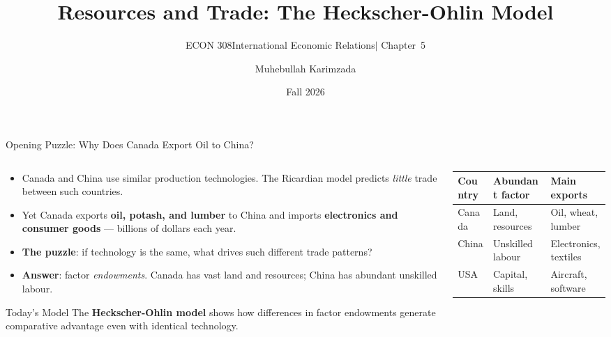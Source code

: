 \documentclass[aspectratio=169]{beamer}
\title{\textbf{Resources and Trade: The Heckscher-Ohlin Model}}
\subtitle{{\large ECON 308\enspace International Economic
  Relations\enspace\textcolor{UNBCGold}{$|$}\enspace
  Chapter~5}}
\author{Muhebullah Karimzada}
\institute{School of Economics\\
           University of Northern British Columbia}
\date{Fall 2026}
\begin{document}

\begin{frame}[plain]
\titlepage
\end{frame}

\begin{frame}[shrink=10]{Opening Puzzle: Why Does Canada Export Oil to China?}
\begin{columns}[T]
\begin{column}{0.55\textwidth}
\begin{itemize}\small
  \item Canada and China use similar production
        technologies. The Ricardian model predicts
        \emph{little} trade between such countries.
  \item Yet Canada exports \textbf{oil, potash, and lumber}
        to China and imports \textbf{electronics and
        consumer goods} --- billions of dollars each year.
  \item \textbf{The puzzle}: if technology is the same,
        what drives such different trade patterns?
  \item \textbf{Answer}: factor \emph{endowments}.
        Canada has vast land and resources; China has
        abundant unskilled labour.
\end{itemize}
\vspace{0.2em}
\begin{insight}{Today's Model}
\small The \textbf{Heckscher-Ohlin model} shows how
differences in factor endowments generate comparative
advantage even with identical technology.
\end{insight}
\end{column}
\begin{column}{0.42\textwidth}
\begin{adjustbox}{max width=\columnwidth}
\begin{tabular}{lll}
\toprule
\textbf{Country} & \textbf{Abundant factor} & \textbf{Main exports}\\
\midrule
Canada & Land, resources & Oil, wheat, lumber\\
China & Unskilled labour & Electronics, textiles\\
USA & Capital, skills & Aircraft, software\\

\end{tabular}
\end{adjustbox}
\end{column}
\end{columns}
\end{frame}
\end{document}
